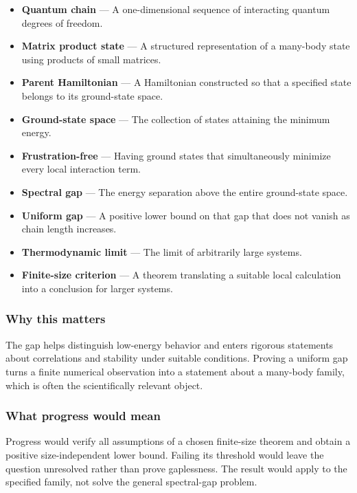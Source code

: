 \documentclass[
  11pt,
]{article}
\begin{document}
\begin{itemize}
\item
  \textbf{Quantum chain} --- A one-dimensional sequence of interacting
  quantum degrees of freedom.
\item
  \textbf{Matrix product state} --- A structured representation of a
  many-body state using products of small matrices.
\item
  \textbf{Parent Hamiltonian} --- A Hamiltonian constructed so that a
  specified state belongs to its ground-state space.
\item
  \textbf{Ground-state space} --- The collection of states attaining the
  minimum energy.
\item
  \textbf{Frustration-free} --- Having ground states that simultaneously
  minimize every local interaction term.
\item
  \textbf{Spectral gap} --- The energy separation above the entire
  ground-state space.
\item
  \textbf{Uniform gap} --- A positive lower bound on that gap that does
  not vanish as chain length increases.
\item
  \textbf{Thermodynamic limit} --- The limit of arbitrarily large
  systems.
\item
  \textbf{Finite-size criterion} --- A theorem translating a suitable
  local calculation into a conclusion for larger systems.
\end{itemize}

\subsubsection{Why this matters}

The gap helps distinguish low-energy behavior and enters rigorous
statements about correlations and stability under suitable conditions.
Proving a uniform gap turns a finite numerical observation into a
statement about a many-body family, which is often the scientifically
relevant object.

\subsubsection{What progress would mean}

Progress would verify all assumptions of a chosen finite-size theorem
and obtain a positive size-independent lower bound. Failing its
threshold would leave the question unresolved rather than prove
gaplessness. The result would apply to the specified family, not solve
the general spectral-gap problem.
\end{document}
